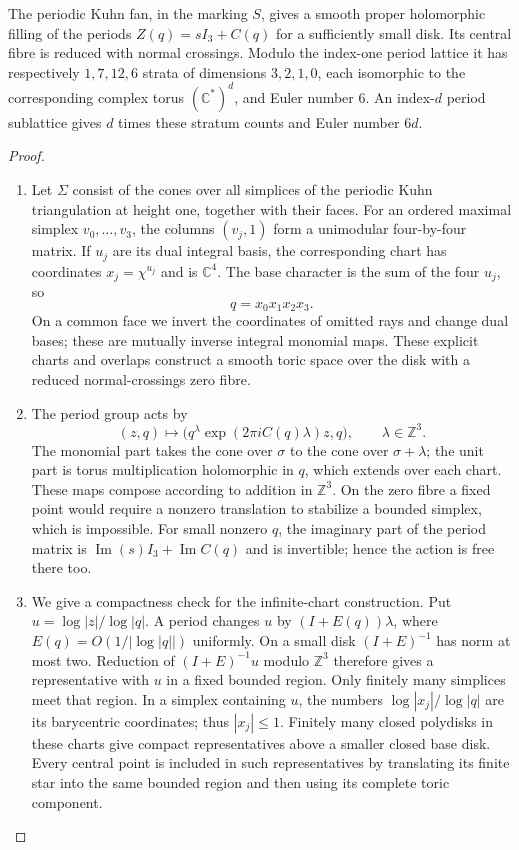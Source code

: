 \begin{theorem}\label{night:P1.9}
The periodic Kuhn fan, in the marking $S$, gives a smooth proper
holomorphic filling of the periods $Z(q)=sI_3+C(q)$ for a sufficiently
small disk.  Its central fibre is reduced with normal crossings.
Modulo the index-one period lattice it has respectively $1,7,12,6$
strata of dimensions $3,2,1,0$, each isomorphic to the corresponding
complex torus $(\mathbb C^*)^d$, and Euler number $6$.
An index-$d$ period sublattice gives $d$ times these stratum counts and
Euler number $6d$.
\end{theorem}
\begin{proof}
\begin{enumerate}[label=\arabic*.]
\item Let $\Sigma$ consist of the cones over all simplices of the periodic
Kuhn triangulation at height one, together with their faces.  For an
ordered maximal simplex $v_0,\ldots,v_3$, the columns $(v_j,1)$ form a
unimodular four-by-four matrix.  If $u_j$ are its dual integral basis,
the corresponding chart has coordinates $x_j=\chi^{u_j}$ and is
$\mathbb C^4$.  The base character is the sum of the four $u_j$, so
\[
q=x_0x_1x_2x_3.
\]
On a common face we invert the coordinates of omitted rays and change
dual bases; these are mutually inverse integral monomial maps.  These
explicit charts and overlaps construct a smooth toric space over the
disk with a reduced normal-crossings zero fibre.

\item The period group acts by
\[
(z,q)\longmapsto
\bigl(q^\lambda\exp(2\pi iC(q)\lambda)z,q\bigr),
\qquad \lambda\in\mathbb Z^3.
\]
The monomial part takes the cone over $\sigma$ to the cone over
$\sigma+\lambda$; the unit part is torus multiplication holomorphic in
$q$, which extends over each chart.  These maps compose according to
addition in $\mathbb Z^3$.  On the zero fibre a fixed point would
require a nonzero translation to stabilize a bounded simplex, which
is impossible.  For small nonzero $q$, the imaginary part of the
period matrix is $\operatorname{Im}(s)I_3+\operatorname{Im}C(q)$ and
is invertible; hence the action is free there too.

\item We give a compactness check for the infinite-chart construction.  Put
$u=\log|z|/\log|q|$.  A period changes $u$ by
$(I+E(q))\lambda$, where $E(q)=O(1/|\log|q||)$ uniformly.
On a small disk $(I+E)^{-1}$ has norm at most two.  Reduction of
$(I+E)^{-1}u$ modulo $\mathbb Z^3$ therefore gives a representative
with $u$ in a fixed bounded region.  Only finitely many simplices
meet that region.  In a simplex containing $u$, the numbers
$\log|x_j|/\log|q|$ are its barycentric coordinates; thus
$|x_j|\leq1$.  Finitely many closed polydisks in these charts give
compact representatives above a smaller closed base disk.  Every
central point is included in such representatives by translating its
finite star into the same bounded region and then using its complete
toric component.


\end{enumerate}
\end{proof}
